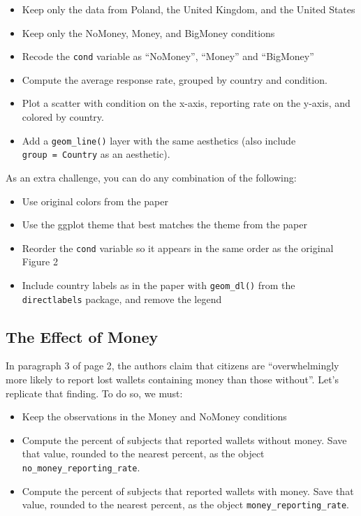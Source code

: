 \documentclass[12pt,halfline,a4paper,]{ouparticle}
\providecommand{\tightlist}{%
  \setlength{\itemsep}{0pt}\setlength{\parskip}{0pt}}
\begin{document}
\begin{itemize}
\tightlist
\item
  Keep only the data from Poland, the United Kingdom, and the United
  States
\item
  Keep only the NoMoney, Money, and BigMoney conditions
\item
  Recode the \texttt{cond} variable as ``NoMoney'', ``Money'' and
  ``BigMoney''
\item
  Compute the average response rate, grouped by country and condition.
\item
  Plot a scatter with condition on the x-axis, reporting rate on the
  y-axis, and colored by country.
\item
  Add a \texttt{geom\_line()} layer with the same aesthetics (also
  include \texttt{group\ =\ Country} as an aesthetic).
\end{itemize}

\noindent As an extra challenge, you can do any combination of the
following:

\begin{itemize}
\tightlist
\item
  Use original colors from the paper
\item
  Use the ggplot theme that best matches the theme from the paper
\item
  Reorder the \texttt{cond} variable so it appears in the same order as
  the original Figure 2
\item
  Include country labels as in the paper with \texttt{geom\_dl()} from
  the \texttt{directlabels} package, and remove the legend
\end{itemize}

\hypertarget{the-effect-of-money}{%
\subsection{The Effect of Money}\label{the-effect-of-money}}

In paragraph 3 of page 2, the authors claim that citizens are
``overwhelmingly more likely to report lost wallets containing money
than those without''. Let's replicate that finding. To do so, we must:

\begin{itemize}
\tightlist
\item
  Keep the observations in the Money and NoMoney conditions
\item
  Compute the percent of subjects that reported wallets without money.
  Save that value, rounded to the nearest percent, as the object
  \texttt{no\_money\_reporting\_rate}.
\item
  Compute the percent of subjects that reported wallets with money. Save
  that value, rounded to the nearest percent, as the object
  \texttt{money\_reporting\_rate}.
\end{itemize}
\end{document}
